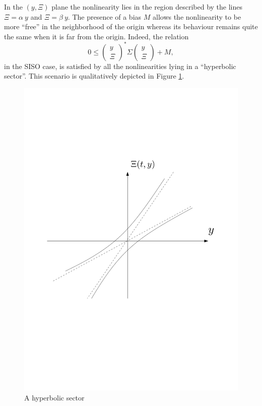 \documentclass[letterpaper,10pt,conference,twocolumn]{IEEEtran}
\begin{document}
	In the $(y,\Xi)$ plane the nonlinearity lies in the region described by the lines $\Xi=\alpha~y$ and $\Xi=\beta~y$. The presence of a bias $M$ allows the nonlinearity to be more ``free'' in the neighborhood of the origin whereas its behaviour remains quite the same when it is far from the origin. Indeed, the relation
	\begin{equation}\nonumber
		0\leq 
		\left(\begin{array}{c}
			y\\
			\Xi
		\end{array}\right)^*
		\Sigma
		\left(\begin{array}{c}
			y\\
			\Xi
		\end{array}\right) +M,
	\end{equation}
in the SISO case, is satisfied by all the nonlinearities lying in a ``hyperbolic sector''.
This scenario is qualitatively depicted in Figure \ref{fig:HyperSector}.
\begin{figure}[hbt]
	\begin{center}
		\includegraphics[width=0.7\columnwidth]{hypersector}
	\end{center}
	\caption{A hyperbolic sector\label{fig:HyperSector}}
\end{figure}
\end{document}
